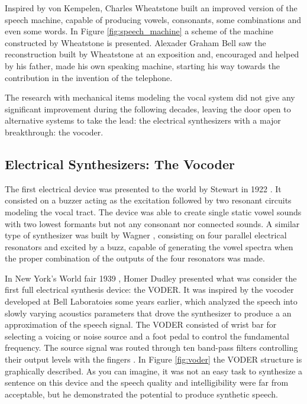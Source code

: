 Inspired by von Kempelen, Charles Wheatstone built an improved version of the speech machine, capable of producing vowels, consonants, some combinations and even some words. In Figure \ref{fig:speech_machine} a scheme of the machine constructed by Wheatstone is presented. Alexader Graham Bell saw the reconstruction built by Wheatstone at an exposition and, encouraged and helped by his father, made his own speaking machine, starting his way towards the contribution in the invention of the telephone.

The research with mechanical items modeling the vocal system did not give any significant improvement during the following decades, leaving the door open to alternative systems to take the lead: the electrical synthesizers with a major breakthrough: the vocoder.

\subsection{Electrical Synthesizers: The Vocoder}
\label{history_vocoder}
The first electrical device was presented to the world by Stewart in 1922 \cite{Klatt87}. It consisted on a buzzer acting as the excitation followed by two resonant circuits modeling the vocal tract. The device was able to create single static vowel sounds with two lowest formants but not any consonant nor connected sounds. A similar type of synthesizer was built by Wagner \cite{flanagan_book}, consisting on four parallel electrical resonators and excited by a buzz, capable of generating the vowel spectra when the proper combination of the outputs of the four resonators was made.

In New York's World fair 1939 \cite{flanagan_book, Klatt87, flanagan_1973_speech}, Homer Dudley presented what was consider the first full electrical synthesis device: the VODER. It was inspired by the vocoder developed at Bell Laboratoies some years earlier, which analyzed the speech into slowly varying acoustics parameters that drove the synthesizer to produce a an approximation of the speech signal. The VODER consisted of wrist bar for selecting a voicing or noise source and a foot pedal to control the fundamental frequency. The source signal was routed through ten band-pass filters controlling their output levels with the fingers \cite{LemmettyMSc}. In Figure \ref{fig:voder} the VODER structure is graphically described. As you can imagine, it was not an easy task to synthesize a sentence on this device and the speech quality and intelligibility were far from acceptable, but he demonstrated the potential to produce synthetic speech.

